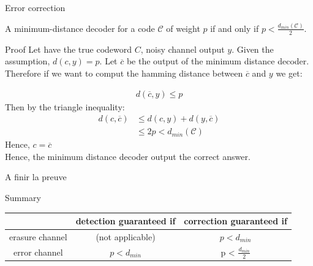 \begin{parag}{Error correction}
    \begin{theoreme}
        A minimum-distance decoder for a code $\mathcal{C}$  of weight $p$ if and only if $p < \frac{d_{min}\left(\mathcal{C}\right)}{2}$.
    \end{theoreme}
    
\end{parag}
\begin{parag}{Proof}
    Let have the true codeword $C$, noisy channel output $y$. Given the assumption, $d\left(c, y\right) = p$. Let $\overline{c}$ be the output of the minimum distance decoder. Therefore if we want to comput the hamming distance between $\overline{c}$ and $y$ we get:
    
    \begin{align*} d\left(\overline{c}, y\right) \leq p \end{align*}
    Then by the triangle inequality: 
    \begin{align*} d\left(c, \overline{c}\right) &\leq d\left(c, y\right) + d\left(y, \overline{c}\right) \\
    &\leq 2p < d_{min}\left(\mathcal{C}\right)
    \end{align*}
    Hence, $c =  \overline{c}$  \\
    Hence, the minimum distance decoder output the correct answer.
    
    A finir la preuve
    
\end{parag}
\begin{parag}{Summary}
   \begin{center}
   \begin{tabular}{c|c|c}
    & detection guaranteed if  & correction guaranteed if \\
    \hline
       erasure channel & (not applicable) & $p < d_{min}$  \\
       \hline
       error channel & $p < d_{min}$ & p < $\frac{d_{min}}{2}$
   \end{tabular}
   \end{center}
    
    
\end{parag}


